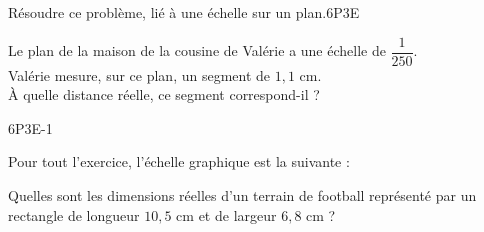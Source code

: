 \documentclass[a4paper,11pt,fleqn]{article}
\begin{document}
\begin{EXO}{Résoudre ce problème, lié à une échelle sur un plan.}{6P3E}

 Le plan de la maison de la cousine de Valérie a une échelle de $\dfrac{1}{250}$.\\
          Valérie mesure, sur ce plan, un segment de $1{,}1$ cm.\\
            À quelle distance réelle, ce segment correspond-il ?
\end{EXO}

\begin{EXO}{}{6P3E-1}

Pour tout l'exercice, l'échelle graphique est la suivante : \\
 Quelles sont les dimensions réelles d'un terrain de football représenté par un rectangle de longueur $10{,}5$ cm et de largeur $6{,}8$ cm ?
\end{EXO}


\clearpage
\end{document}
